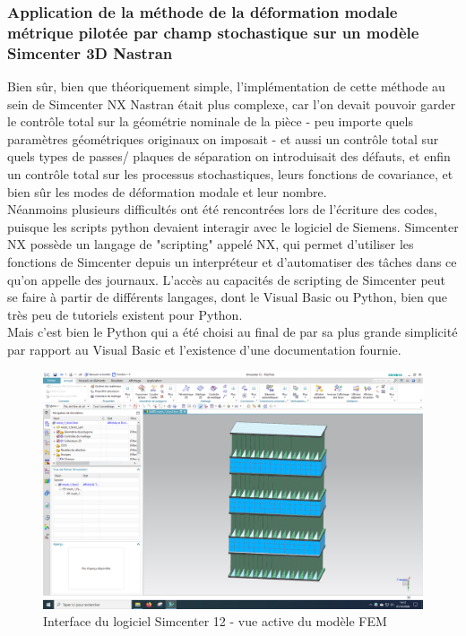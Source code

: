 \documentclass[a4paper,10pt]{article}
\begin{document}
\subsubsection{Application de la méthode de la déformation modale métrique pilotée par champ stochastique sur un modèle Simcenter 3D Nastran}

Bien sûr, bien que théoriquement simple, l'implémentation de cette méthode au sein de Simcenter NX Nastran était plus complexe, car l'on devait pouvoir garder le contrôle total sur la géométrie nominale de la pièce - peu importe quels paramètres géométriques originaux on imposait - et aussi un contrôle total sur quels types de passes/ plaques de séparation on introduisait des défauts, et enfin un contrôle total sur les processus stochastiques, leurs fonctions de covariance, et bien sûr les modes de déformation modale et leur nombre.\\

Néanmoins plusieurs difficultés ont été rencontrées lors de l'écriture des codes, puisque les scripts python devaient interagir avec le logiciel de Siemens. Simcenter NX possède un langage de "scripting" appelé NX, qui permet d'utiliser les fonctions de Simcenter depuis un interpréteur et d'automatiser des tâches dans ce qu'on appelle des journaux. L'accès au capacités de scripting de Simcenter peut se faire à partir de différents langages, dont le Visual Basic ou Python, bien que très peu de tutoriels existent pour Python. \\

Mais c'est bien le Python qui a été choisi au final de par sa plus grande simplicité par rapport au Visual Basic et l'existence d'une documentation fournie. \\

\begin{figure}[H]
   \centering   
   \includegraphics[scale=0.18]{SimcenterInterface.PNG}
      \caption{Interface du logiciel Simcenter 12 - vue active du modèle FEM}
         \label{SimcenterInterface}
\end{figure}
\end{document}
